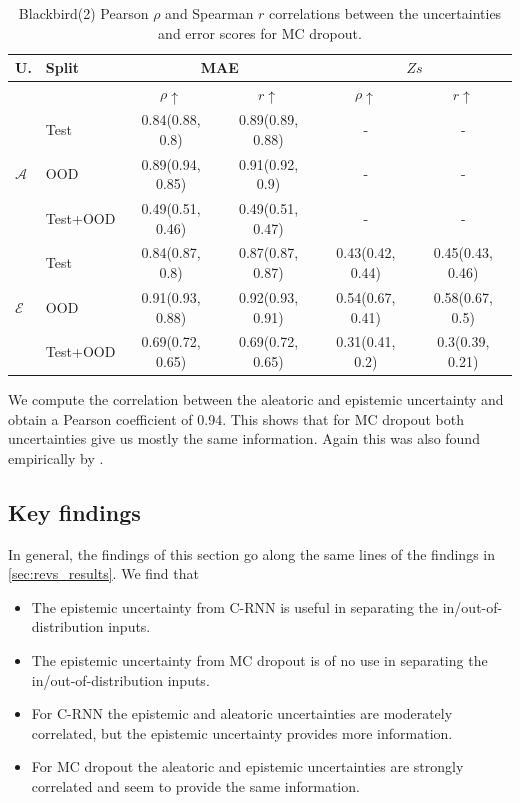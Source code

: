 \begin{table}[h]
\centering
    \begin{tabular}{l l c c c c}  
        \toprule
        U. & Split & \multicolumn{2}{c}{MAE} & \multicolumn{2}{c}{$Zs$}\\
        \midrule
        & & $\rho \uparrow$ & $r \uparrow$ & $\rho \uparrow$ & $r \uparrow$ \\
        \multirow{3}{*}{$\mathcal{A}$} 
            & Test     & 0.84(0.88, 0.8) & 0.89(0.89, 0.88) & - & - \\  
            & OOD      & 0.89(0.94, 0.85) & 0.91(0.92, 0.9) & - & - \\  
            & Test+OOD & 0.49(0.51, 0.46) & 0.49(0.51, 0.47) & - & - \\ 

        \midrule
        \multirow{3}{*}{$\mathcal{E}$} 
            & Test     & 0.84(0.87, 0.8)  & 0.87(0.87, 0.87) & 0.43(0.42, 0.44) & 0.45(0.43, 0.46) \\  
            & OOD      & 0.91(0.93, 0.88) & 0.92(0.93, 0.91) & 0.54(0.67, 0.41) & 0.58(0.67, 0.5) \\
            & Test+OOD & 0.69(0.72, 0.65) & 0.69(0.72, 0.65) & 0.31(0.41, 0.2) & 0.3(0.39, 0.21) \\ 

        \toprule
    \end{tabular}
    \caption{Blackbird(2) Pearson $\rho$ and Spearman $r$ correlations between the uncertainties and error scores for MC dropout.}
    \label{tbl:bb2_dropout_corr}
\end{table}

We compute the correlation between the aleatoric and epistemic uncertainty and obtain a Pearson coefficient of 0.94. This shows that for MC dropout both uncertainties give us mostly the same information. Again this was also found empirically by \cite{kendall2017uncertainties}. 

\clearpage
\subsection{Key findings}

In general, the findings of this section go along the same lines of the findings in \cref{sec:revs_results}. We find that 

\begin{itemize}
    \item The epistemic uncertainty from C-RNN is useful in separating the in/out-of-distribution inputs.
    \item The epistemic uncertainty from MC dropout is of no use in separating the in/out-of-distribution inputs.
    \item For C-RNN the epistemic and aleatoric uncertainties are moderately correlated, but the epistemic uncertainty provides more information. 
    \item For MC dropout the aleatoric and epistemic uncertainties are strongly correlated and seem to provide the same information. 
\end{itemize}{}


